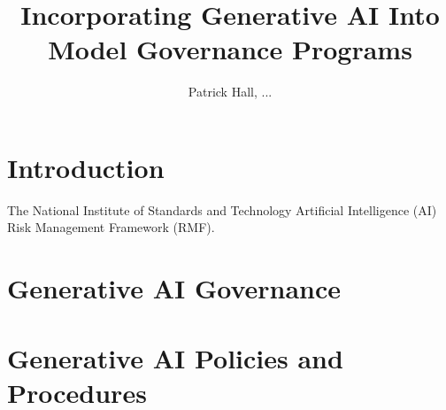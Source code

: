 \documentclass[fleqn]{article}
\title{Incorporating Generative AI Into Model Governance Programs}
\author{Patrick Hall, ...}
\begin{document}
\maketitle

\begin{abstract}
	

\end{abstract}

\section{Introduction} \label{sec:intro}

The National Institute of Standards and Technology Artificial Intelligence (AI) Risk Management Framework (RMF).\cite{airmf}





\section{Generative AI Governance}\label{sec:govern}


\section{Generative AI Policies and Procedures}\label{sec:polpro}
\end{document}
